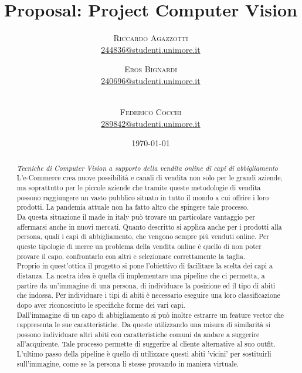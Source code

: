 \documentclass[10pt]{article}
\title{Proposal: Project Computer Vision}
\author{
    \textsc{Riccardo Agazzotti} \\[1ex]
    \normalsize \href{mailto:244836@studenti.unimore.it}{244836@studenti.unimore.it}
    \and
    \textsc{Eros Bignardi} \\[1ex]
    \normalsize \href{mailto:289842@studenti.unimore.it}{240696@studenti.unimore.it} 
    \and
    \\[1ex]
    \textsc{Federico Cocchi} \\[1ex]
    \normalsize \href{mailto:289842@studenti.unimore.it}{289842@studenti.unimore.it}
    \\[1ex]
    }
\date{\today}
\begin{document}
\maketitle
\begin{abstract}
    \noindent \textit{Tecniche di Computer Vision a supporto della vendita online di capi di abbigliamento} 
    \newline
    \newline
    \noindent L'e-Commerce crea nuove possibilità e canali di vendita non solo per le grandi aziende, 
    ma soprattutto per le piccole aziende che tramite queste metodologie di vendita possono raggiungere un vasto pubblico situato in tutto il mondo a cui offrire i loro prodotti. 
    La pandemia attuale non ha fatto altro che spingere tale processo. \\
    Da questa situazione il made in italy può trovare un particolare vantaggio per affermarsi anche in nuovi mercati.
    Quanto descritto si applica anche per i prodotti alla persona, quali i capi di abbigliamento, che vengono sempre più venduti online. 
    Per queste tipologie di merce un problema della vendita online è quello di non poter provare il capo, confrontarlo con altri e selezionare correttamente la taglia. \\
    Proprio in quest'ottica il progetto si pone l'obiettivo di facilitare la scelta dei capi a distanza.
    La nostra idea è quella di implementare una pipeline che ci permetta, a partire da un'immagine di una persona, di individuare la posizione ed il tipo di abiti che indossa.
    Per individuare i tipi di abiti è necessario eseguire una loro classificazione dopo aver riconosciuto le specifiche forme dei vari capi. \\
    Dall'immagine di un capo di abbigliamento si può inoltre estrarre un feature vector che rappresenta le sue caratteristiche.
    Da queste utilizzando una misura di similarità si possono individuare altri abiti con caratteristiche comuni da andare a suggerire all'acquirente.
    Tale processo permette di suggerire al cliente alternative al suo outfit.
    L'ultimo passo della pipeline è quello di utilizzare questi abiti 'vicini' per sostituirli sull'immagine,
    come se la persona li stesse provando in maniera virtuale.
    
\end{abstract}
\pagebreak
\end{document}
